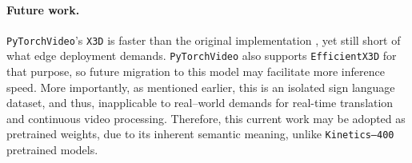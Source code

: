 \paragraph{Future work.} \texttt{PyTorchVideo}'s \texttt{X3D} is faster than the original implementation \cite{feichtenhofer2020x3d, pyslowfast}, yet still short of what edge deployment demands.
\texttt{PyTorchVideo} also supports \texttt{EfficientX3D} for that purpose, so future migration to this model may facilitate more inference speed.
More importantly, as mentioned earlier, this is an isolated sign language dataset, and thus, inapplicable to real–world demands for real-time translation and continuous video processing.
Therefore, this current work may be adopted as pretrained weights, due to its inherent semantic meaning, unlike \texttt{Kinetics–400} pretrained models.